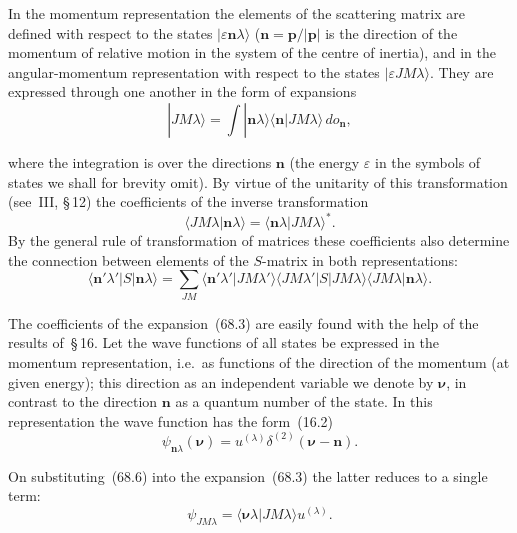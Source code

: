 In the momentum representation the elements of the scattering matrix are defined with respect to the states $|\varepsilon\mathbf{n}\lambda\rangle$ ($\mathbf{n} = \mathbf{p}/|\mathbf{p}|$ is the direction of the momentum of relative motion in the system of the centre of inertia), and in the angular-momentum representation with respect to the states $|\varepsilon JM\lambda\rangle$. They are expressed through one another in the form of expansions
\begin{equation}
|JM\lambda\rangle = \int|\mathbf{n}\lambda\rangle\langle\mathbf{n}|JM\lambda\rangle\,do_\mathbf{n},
\tag{68.3}
\end{equation}

where the integration is over the directions $\mathbf{n}$ (the energy $\varepsilon$ in the symbols of states we shall for brevity omit). By virtue of the unitarity of this transformation (see~III, \S\,12) the coefficients of the inverse transformation
\begin{equation}
\langle JM\lambda|\mathbf{n}\lambda\rangle = \langle\mathbf{n}\lambda|JM\lambda\rangle^*.
\tag{68.4}
\end{equation}
By the general rule of transformation of matrices these coefficients also determine the connection between elements of the $S$-matrix in both representations:
\begin{equation}
\langle\mathbf{n}'\lambda'|S|\mathbf{n}\lambda\rangle = \sum_{JM}\langle\mathbf{n}'\lambda'|JM\lambda'\rangle\langle JM\lambda'|S|JM\lambda\rangle\langle JM\lambda|\mathbf{n}\lambda\rangle.
\tag{68.5}
\end{equation}

The coefficients of the expansion~(68.3) are easily found with the help of the results of~\S\,16. Let the wave functions of all states be expressed in the momentum representation, i.e.\ as functions of the direction of the momentum (at given energy); this direction as an independent variable we denote by $\boldsymbol{\nu}$, in contrast to the direction $\mathbf{n}$ as a quantum number of the state. In this representation the wave function has the form~(16.2)
\begin{equation}
\psi_{\mathbf{n}\lambda}(\boldsymbol{\nu}) = u^{(\lambda)}\delta^{(2)}(\boldsymbol{\nu} - \mathbf{n}).
\tag{68.6}
\end{equation}

On substituting~(68.6) into the expansion~(68.3) the latter reduces to a single term:
\begin{equation}
\psi_{JM\lambda} = \langle\boldsymbol{\nu}\lambda|JM\lambda\rangle u^{(\lambda)}.
\tag{68.7}
\end{equation}

